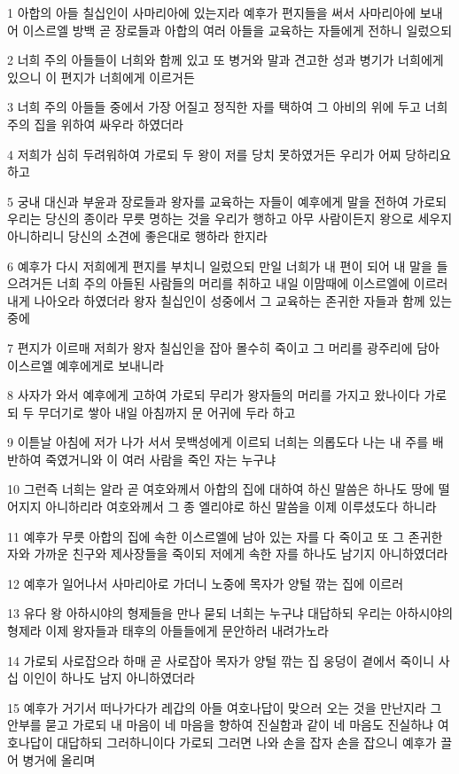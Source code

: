 \par 1 아합의 아들 칠십인이 사마리아에 있는지라 예후가 편지들을 써서 사마리아에 보내어 이스르엘 방백 곧 장로들과 아합의 여러 아들을 교육하는 자들에게 전하니 일렀으되
\par 2 너희 주의 아들들이 너희와 함께 있고 또 병거와 말과 견고한 성과 병기가 너희에게 있으니 이 편지가 너희에게 이르거든
\par 3 너희 주의 아들들 중에서 가장 어질고 정직한 자를 택하여 그 아비의 위에 두고 너희 주의 집을 위하여 싸우라 하였더라
\par 4 저희가 심히 두려워하여 가로되 두 왕이 저를 당치 못하였거든 우리가 어찌 당하리요 하고
\par 5 궁내 대신과 부윤과 장로들과 왕자를 교육하는 자들이 예후에게 말을 전하여 가로되 우리는 당신의 종이라 무릇 명하는 것을 우리가 행하고 아무 사람이든지 왕으로 세우지 아니하리니 당신의 소견에 좋은대로 행하라 한지라
\par 6 예후가 다시 저희에게 편지를 부치니 일렀으되 만일 너희가 내 편이 되어 내 말을 들으려거든 너희 주의 아들된 사람들의 머리를 취하고 내일 이맘때에 이스르엘에 이르러 내게 나아오라 하였더라 왕자 칠십인이 성중에서 그 교육하는 존귀한 자들과 함께 있는 중에
\par 7 편지가 이르매 저희가 왕자 칠십인을 잡아 몰수히 죽이고 그 머리를 광주리에 담아 이스르엘 예후에게로 보내니라
\par 8 사자가 와서 예후에게 고하여 가로되 무리가 왕자들의 머리를 가지고 왔나이다 가로되 두 무더기로 쌓아 내일 아침까지 문 어귀에 두라 하고
\par 9 이튿날 아침에 저가 나가 서서 뭇백성에게 이르되 너희는 의롭도다 나는 내 주를 배반하여 죽였거니와 이 여러 사람을 죽인 자는 누구냐
\par 10 그런즉 너희는 알라 곧 여호와께서 아합의 집에 대하여 하신 말씀은 하나도 땅에 떨어지지 아니하리라 여호와께서 그 종 엘리야로 하신 말씀을 이제 이루셨도다 하니라
\par 11 예후가 무릇 아합의 집에 속한 이스르엘에 남아 있는 자를 다 죽이고 또 그 존귀한 자와 가까운 친구와 제사장들을 죽이되 저에게 속한 자를 하나도 남기지 아니하였더라
\par 12 예후가 일어나서 사마리아로 가더니 노중에 목자가 양털 깎는 집에 이르러
\par 13 유다 왕 아하시야의 형제들을 만나 묻되 너희는 누구냐 대답하되 우리는 아하시야의 형제라 이제 왕자들과 태후의 아들들에게 문안하러 내려가노라
\par 14 가로되 사로잡으라 하매 곧 사로잡아 목자가 양털 깎는 집 웅덩이 곁에서 죽이니 사십 이인이 하나도 남지 아니하였더라
\par 15 예후가 거기서 떠나가다가 레갑의 아들 여호나답이 맞으러 오는 것을 만난지라 그 안부를 묻고 가로되 내 마음이 네 마음을 향하여 진실함과 같이 네 마음도 진실하냐 여호나답이 대답하되 그러하니이다 가로되 그러면 나와 손을 잡자 손을 잡으니 예후가 끌어 병거에 올리며
